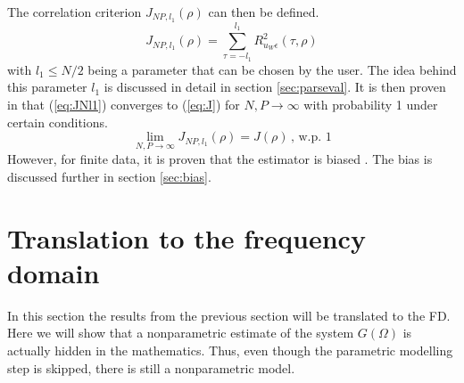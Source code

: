 The correlation criterion $J_{N\!P,l_1}(\rho)$ can then be defined.
\begin{equation}
\boxed{
    J_{N\!P,l_1}(\rho) = \sum_{\tau=-l_1}^{l_1} R_{u_W \epsilon}^2(\tau,\rho)
}
\label{eq:JNl1}
\end{equation}
with $l_1 \leq N/2$ being a parameter that can be chosen by the user. The idea behind this parameter $l_1$ is discussed in detail in section \ref{sec:parseval}. It is then proven in \cite[Appendix II]{Data-driven_model_reference_control} that (\ref{eq:JNl1}) converges to (\ref{eq:J}) for $N,P \rightarrow \infty$ with probability 1 under certain conditions.
\begin{equation*}
    \lim_{N,P\rightarrow \infty} J_{N\!P,l_1}(\rho) = J(\rho) \,,\, \text{w.p. } 1
\end{equation*}
However, for finite data, it is proven that the estimator is biased \cite[eq. (37)]{Data-driven_model_reference_control}. The bias is discussed further in section \ref{sec:bias}.

\section{Translation to the frequency domain}
\label{sec:freq_domain_translate}
In this section the results from the previous section will be translated to the FD. Here we will show that a nonparametric estimate of the system $G(\Omega)$ is actually hidden in the mathematics. Thus, even though the parametric modelling step is skipped, there is still a nonparametric model.

